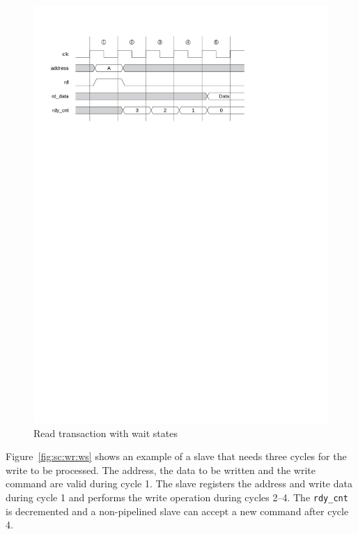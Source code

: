 \documentclass[a4paper,12pt]{scrartcl}
\newcommand{\sign}[1]{{\texttt{#1}}}
\begin{document}
\begin{figure}
    \centering
    \includegraphics{figures/sc_rd_ws}
    \caption{Read transaction with wait states}
    \label{fig:sc:rd:ws}
\end{figure}


Figure~\ref{fig:sc:wr:ws} shows an example of a slave that needs
three cycles for the write to be processed. The address, the data to
be written and the write command are valid during cycle 1. The slave
registers the address and write data during cycle 1 and performs the
write operation during cycles 2--4. The \sign{rdy\_cnt} is
decremented and a non-pipelined slave can accept a new command after
cycle 4.
\end{document}
